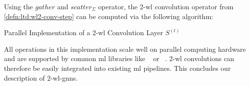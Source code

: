 Using the $\mathit{gather}$ and $\mathit{scatter}_{\Sigma}$ operator, the 2-\acs{wl} convolution operator from \cref{defn:ltd:wl2-conv-step} can be computed via the following algorithm:
\begin{algorithm}[H]
	\caption{Parallel Implementation of a 2-\acs{wl} Convolution Layer $S^{(t)}$}\label{algo:ltd:wl2-conv}
	\begin{algorithmic}[1]
		\EndFunction{}
	\end{algorithmic}
\end{algorithm}
All operations in this implementation scale well on parallel computing hardware and are supported by common \ac{ml} libraries like ~\cite{Abadi2015}\cite{TF} or ~\cite{Paszke2019}\cite{PyT}.
2-\acs{wl} convolutions can therefore be easily integrated into existing \ac{ml} pipelines.
This concludes our description of 2-\acs{wl}-\acsp{gnn}.
